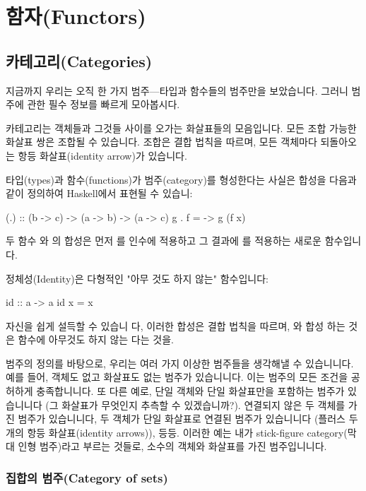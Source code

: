\documentclass[DaoFP]{subfiles}
\begin{document}
\setcounter{chapter}{7}

\chapter{함자(Functors)}
\section{카테고리(Categories)}

지금까지 우리는 오직 한 가지 범주---타입과 함수들의 범주만을 보았습니다. 그러니 범주에 관한 필수 정보를 빠르게 모아봅시다.

카테고리는 객체들과 그것들 사이를 오가는 화살표들의 모음입니다. 모든 조합 가능한 화살표 쌍은 조합될 수 있습니다. 조합은 결합 법칙을 따르며, 모든 객체마다 되돌아오는 항등 화살표(identity arrow)가 있습니다.

타입(types)과 함수(functions)가 범주(category)를 형성한다는 사실은 합성을 다음과 같이 정의하여 Haskell에서 표현될 수 있습니:

\begin{haskell}
(.) :: (b -> c) -> (a -> b) -> (a -> c)
g . f = \x -> g (f x)
\end{haskell}
두 함수 와 의 합성은 먼저 를 인수에 적용하고 그 결과에 를 적용하는 새로운 함수입니다.

정체성(Identity)은 다형적인 "아무 것도 하지 않는" 함수입니다:
\begin{haskell}
id :: a -> a
id x = x
\end{haskell}
자신을 쉽게 설득할 수 있습니 다, 이러한 합성은 결합 법칙을 따르며,  와 합성 하는 것은 함수에 아무것도 하지 않는 다는 것을.

범주의 정의를 바탕으로, 우리는 여러 가지 이상한 범주들을 생각해낼 수 있습니니다. 예를 들어, 객체도 없고 화살표도 없는 범주가 있습니니다. 이는 범주의 모든 조건을 공허하게 충족합니니다. 또 다른 예로, 단일 객체와 단일 화살표만을 포함하는 범주가 있습니니다 (그 화살표가 무엇인지 추측할 수 있겠습니까?). 연결되지 않은 두 객체를 가진 범주가 있습니니다, 두 객체가 단일 화살표로 연결된 범주가 있습니니다 (플러스 두 개의 항등 화살표(identity arrows)), 등등. 이러한 예는 내가 stick-figure category(막대 인형 범주)라고 부르는 것들로, 소수의 객체와 화살표를 가진 범주입니니다.
\subsection{집합의 범주(Category of sets)}
\end{document}
